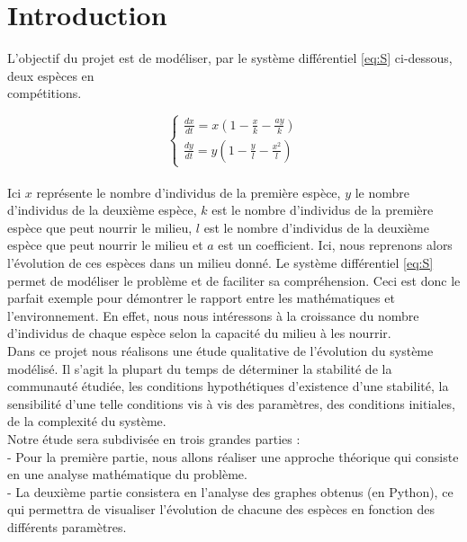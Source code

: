 \documentclass{article}
\begin{document}
\tableofcontents
\newpage

\section*{Introduction}
L'objectif du projet est de modéliser, par le système différentiel \eqref{eq:S} ci-dessous, deux espèces en \\compétitions.

\begin{equation}
\tag{S}
\label{eq:S}
\left\{
\begin{array}{ll}
    \frac{dx}{dt} =  x(1 - \frac{x}{k} - \frac{a y}{k}) \\
    \frac{dy}{dt} = y(1- \frac{y}{l} - \frac{x^{2}}{l})
\end{array}
\right.
\end{equation}\\

Ici $x$ représente le nombre d’individus de la première espèce, $y$ le nombre d’individus de la
deuxième espèce, $k$ est le nombre d’individus de la première espèce que peut nourrir le milieu, $l$ est le nombre d’individus de la deuxième espèce que peut nourrir le milieu et $a$ est un coefficient. Ici, nous reprenons alors l'évolution de ces espèces dans un milieu donné. Le système différentiel \eqref{eq:S} permet de modéliser le problème et de faciliter sa compréhension. Ceci est donc le parfait exemple pour démontrer le rapport entre les mathématiques et l'environnement. En effet, nous nous intéressons à la croissance du nombre d'individus de chaque espèce selon la capacité du milieu à les nourrir.\\

Dans ce projet nous réalisons une étude qualitative de l’évolution du système modélisé. Il s’agit la plupart du temps de déterminer la stabilité de la communauté étudiée, les conditions hypothétiques d’existence d’une stabilité, la sensibilité d’une telle conditions vis à vis des paramètres, des conditions initiales, de la complexité du système.\\

Notre étude sera subdivisée en trois grandes parties :\\

- Pour la première partie, nous allons réaliser une approche théorique qui consiste en une analyse mathématique du problème. \\

- La deuxième partie consistera en l'analyse des graphes obtenus (en Python), ce qui permettra de visualiser l'évolution de chacune des espèces en fonction des différents paramètres.\\
\end{document}
